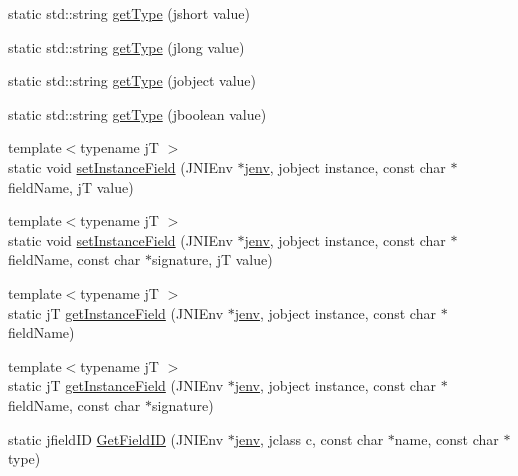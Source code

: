 \begin{DoxyCompactItemize}
\item 
static std\-::string \hyperlink{class_j_n_i_helper_a206d661817dd7011bf611e2c52160d59}{get\-Type} (jshort value)
\item 
static std\-::string \hyperlink{class_j_n_i_helper_a2a101aa6ff2af7a1ca5d80be913ea46a}{get\-Type} (jlong value)
\item 
static std\-::string \hyperlink{class_j_n_i_helper_a89e129b46a8d1cdee4e9ac5840d42f30}{get\-Type} (jobject value)
\item 
static std\-::string \hyperlink{class_j_n_i_helper_a777e896380d762f15c61c051907fa98d}{get\-Type} (jboolean value)
\item 
{\footnotesize template$<$typename j\-T $>$ }\\static void \hyperlink{class_j_n_i_helper_a950f746b15f97df78e3150de33c16422}{set\-Instance\-Field} (J\-N\-I\-Env $\ast$\hyperlink{aparapi_8cpp_a31595c73e9a3750524b2ff61b5a14f96}{jenv}, jobject instance, const char $\ast$field\-Name, j\-T value)
\item 
{\footnotesize template$<$typename j\-T $>$ }\\static void \hyperlink{class_j_n_i_helper_aecce0e924d9c77e74e09220ba3112c87}{set\-Instance\-Field} (J\-N\-I\-Env $\ast$\hyperlink{aparapi_8cpp_a31595c73e9a3750524b2ff61b5a14f96}{jenv}, jobject instance, const char $\ast$field\-Name, const char $\ast$signature, j\-T value)
\item 
{\footnotesize template$<$typename j\-T $>$ }\\static j\-T \hyperlink{class_j_n_i_helper_a1c640a98f51b1ace46bd99c8c1a75557}{get\-Instance\-Field} (J\-N\-I\-Env $\ast$\hyperlink{aparapi_8cpp_a31595c73e9a3750524b2ff61b5a14f96}{jenv}, jobject instance, const char $\ast$field\-Name)
\item 
{\footnotesize template$<$typename j\-T $>$ }\\static j\-T \hyperlink{class_j_n_i_helper_a1840235841c1159432d86a7a545564bd}{get\-Instance\-Field} (J\-N\-I\-Env $\ast$\hyperlink{aparapi_8cpp_a31595c73e9a3750524b2ff61b5a14f96}{jenv}, jobject instance, const char $\ast$field\-Name, const char $\ast$signature)
\item 
static jfield\-I\-D \hyperlink{class_j_n_i_helper_adc97179237bf9d5b36d06663c6bbc074}{Get\-Field\-I\-D} (J\-N\-I\-Env $\ast$\hyperlink{aparapi_8cpp_a31595c73e9a3750524b2ff61b5a14f96}{jenv}, jclass c, const char $\ast$name, const char $\ast$type)
\end{DoxyCompactItemize}
